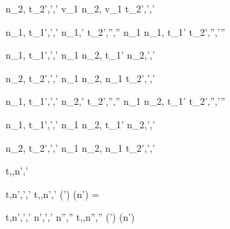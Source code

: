 
	{n_2,\sigma \handle{\iota} t_2',\sigma',\delta'}
	{v_1 \Trans n_2,\sigma \handle{\iota} v_1 \Trans t_2',\sigma',\delta'}
  {}


  {n_1,\sigma \handle{\iota} t_1',\sigma',\delta' \Quad
   n_1,\sigma' \handle{\iota} t_2',\sigma'',\delta''}
  {n_1 \Pair n_1,\sigma \handle{\iota} t_1' \Pair t_2',\sigma'',\delta'\cup\delta''}
  {}

  {n_1,\sigma \handle{\iota} t_1',\sigma',\delta'}
  {n_1 \Pair n_2,\sigma \handle{\iota} t_1' \Pair n_2,\sigma',\delta'}
  {}

  {n_2,\sigma \handle{\iota} t_2',\sigma',\delta'}
  {n_1 \Pair n_2,\sigma \handle{\iota} n_1 \Pair t_2',\sigma',\delta'}
  {}

  {n_1,\sigma \handle{\iota} t_1',\sigma',\delta' \Quad
   n_2,\sigma' \handle{\iota} t_2',\sigma'',\delta''}
  {n_1 \Choose n_2,\sigma \handle{\iota} t_1' \Choose t_2',\sigma'',\delta'\cup\delta''}
  {}

  {n_1,\sigma \handle{\iota} t_1',\sigma',\delta'}
  {n_1 \Choose n_2,\sigma \handle{\iota} t_1' \Choose n_2,\sigma',\delta'}
  {}

  {n_2,\sigma \handle{\iota} t_2',\sigma',\delta'}
  {n_1 \Choose n_2,\sigma \handle{\iota} n_1 \Choose t_2',\sigma',\delta'}
  {}




  {t,\sigma,\delta \fixate n',\sigma'}

  {t,\sigma \normalise n',\sigma',\delta'}
  {t,\sigma,\delta \fixate n',\sigma'}
  {(\delta \cup \delta') \cap \Watching(n') = \nothing}

  {t,\sigma \normalise n',\sigma',\delta' \Quad
   n',\sigma',\delta' \fixate n'',\sigma''}
  {t,\sigma,\delta \fixate n'',\sigma''}
  {(\delta \cup \delta') \cap \Watching(n') \neq \nothing}





